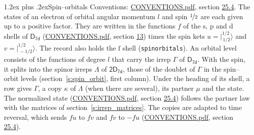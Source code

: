 \documentclass[10pt,a4paper]{article}
\makeatletter
\renewcommand\section{\@startsection{section}{1}{\z@}{-3ex plus -1ex minus -.2ex}%
  {1.2ex plus .2ex}{\normalfont\large\sffamily\bfseries\color{parttitle}}}
\numberwithin{equation}{section}
\newcommand{\grp}[1]{\mathsf{#1}}
\newcommand{\orbital}[1]{\mathrm{#1}}
\newcommand{\mult}{\kappa}
\newcommand{\intx}{\mu}
\newcommand{\jm}[2]{\bigl\lvert{}^{#1}_{\,#2}\bigr\rangle}
\makeatother
\begin{document}
\section{Spin--orbitals}\label{s:spin_orbitals}
Conventions: \href{../../CONVENTIONS.pdf}{CONVENTIONS.pdf}, section \href{../../CONVENTIONS.pdf\#conv.25.4}{25.4}.
\leavevmode\label{n:index.orbital.l}The states of an electron of orbital angular momentum $l$ and spin $\nicefrac{1}{2}$ are each given up to a positive factor. \label{n:local.spinor.uv}\label{n:local.function.f}They are written in the functions $f$ of the $\orbital{s}$, $\orbital{p}$ and $\orbital{d}$ shells of \href{../../../rotation/data/pdf/D7d.pdf}{$\grp{D_{7d}}$} (\href{../../CONVENTIONS.pdf}{CONVENTIONS.pdf}, section \href{../../../rotation/CONVENTIONS.pdf\#conv.13}{13}) times the spin kets $u = \jm{1/2}{1/2}$ and $v = \jm{1/2}{-1/2}$. The record also holds the $\orbital{f}$ shell (\texttt{spinorbitals}). An orbital level consists of the functions of degree $l$ that carry the irrep $\Gamma$ of \href{../../../rotation/data/pdf/D7d.pdf}{$\grp{D_{7d}}$}. With the spin, it splits into the spinor irreps $\Lambda$ of $\grp{2D_{7d}}$, those of the doublet of $\Gamma$ in the spin--orbit levels (section~\ref{s:spin_orbit}, first column). \label{n:head.state}Under the heading of its shell, a row gives $\Gamma$, a copy $\mult$ of $\Lambda$ (when there are several), its partner $\intx$ and the state. The normalized state (\href{../../CONVENTIONS.pdf}{CONVENTIONS.pdf}, section \href{../../CONVENTIONS.pdf\#conv.25.4}{25.4}) follows the partner law with the matrices of section~\ref{s:irrep_matrices}. The copies are adapted to time reversal, which sends $f u$ to $f v$ and $f v$ to $-f u$ (\href{../../CONVENTIONS.pdf}{CONVENTIONS.pdf}, section \href{../../CONVENTIONS.pdf\#conv.25.4}{25.4}).
\end{document}
